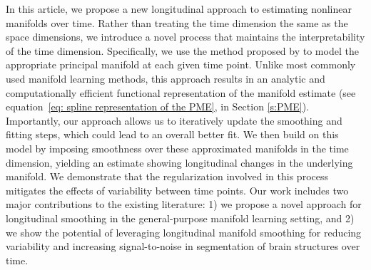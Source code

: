\documentclass[11pt,reqno]{article}
\theoremstyle{definition}
\begin{document}
In this article, we propose a new longitudinal approach to estimating nonlinear manifolds over time. Rather than treating the time dimension the same as the space dimensions, we introduce a novel process that maintains the interpretability of the time dimension. Specifically, we use the method proposed by \cite{mengPrincipalManifoldEstimation2021} to model the appropriate principal manifold at each given time point. Unlike most commonly used manifold learning methods, this approach results in an analytic and computationally efficient functional representation of the manifold estimate (see equation~\eqref{eq: spline representation of the PME}, in Section \ref{s:PME}). Importantly, our approach allows us to iteratively update the smoothing and fitting steps, which could lead to an overall better fit. We then build on this model by imposing smoothness over these approximated manifolds in the time dimension, yielding an estimate showing longitudinal changes in the underlying manifold. We demonstrate that the regularization involved in this process mitigates the effects of variability between time points. Our work includes two major contributions to the existing literature: 1) we propose a novel approach for longitudinal smoothing in the general-purpose manifold learning setting, and 2) we show the potential of leveraging longitudinal manifold smoothing for reducing variability and increasing signal-to-noise in segmentation of brain structures over time. 

\end{document}
